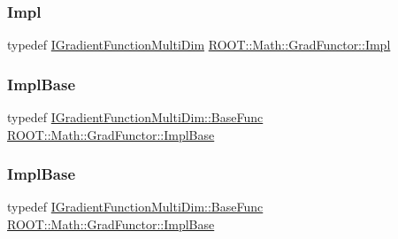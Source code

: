 \subsubsection{\texorpdfstring{Impl}{Impl}\hspace{0.1cm}{\footnotesize\ttfamily [2/2]}}
{\footnotesize\ttfamily typedef \mbox{\hyperlink{classROOT_1_1Math_1_1IGradientFunctionMultiDim}{I\+Gradient\+Function\+Multi\+Dim}} \mbox{\hyperlink{classROOT_1_1Math_1_1GradFunctor_a4ce94e1b525d38a2d7da3c88ace6e0f9}{R\+O\+O\+T\+::\+Math\+::\+Grad\+Functor\+::\+Impl}}}

\mbox{\label{classROOT_1_1Math_1_1GradFunctor_a1fb9161fc93c7e7fa185dddbcc2c4f4d}} 
\subsubsection{\texorpdfstring{ImplBase}{ImplBase}\hspace{0.1cm}{\footnotesize\ttfamily [1/2]}}
{\footnotesize\ttfamily typedef \mbox{\hyperlink{classROOT_1_1Math_1_1IGradientFunctionMultiDim_a803074495bafb5acf9f130b648001609}{I\+Gradient\+Function\+Multi\+Dim\+::\+Base\+Func}} \mbox{\hyperlink{classROOT_1_1Math_1_1GradFunctor_a1fb9161fc93c7e7fa185dddbcc2c4f4d}{R\+O\+O\+T\+::\+Math\+::\+Grad\+Functor\+::\+Impl\+Base}}}

\mbox{\label{classROOT_1_1Math_1_1GradFunctor_a1fb9161fc93c7e7fa185dddbcc2c4f4d}} 
\subsubsection{\texorpdfstring{ImplBase}{ImplBase}\hspace{0.1cm}{\footnotesize\ttfamily [2/2]}}
{\footnotesize\ttfamily typedef \mbox{\hyperlink{classROOT_1_1Math_1_1IGradientFunctionMultiDim_a803074495bafb5acf9f130b648001609}{I\+Gradient\+Function\+Multi\+Dim\+::\+Base\+Func}} \mbox{\hyperlink{classROOT_1_1Math_1_1GradFunctor_a1fb9161fc93c7e7fa185dddbcc2c4f4d}{R\+O\+O\+T\+::\+Math\+::\+Grad\+Functor\+::\+Impl\+Base}}}



